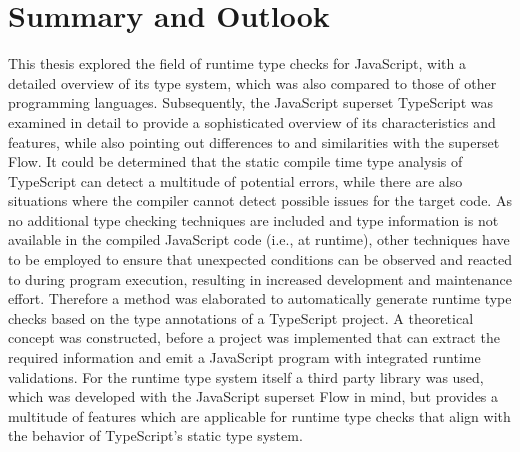 \chapter{Summary and Outlook}
\label{cha:summary_outlook}

This thesis explored the field of runtime type checks for JavaScript, with a detailed overview of its type system, which was also compared to those of other programming languages. Subsequently, the JavaScript superset TypeScript was examined in detail to provide a sophisticated overview of its characteristics and features, while also pointing out differences to and similarities with the superset Flow. It could be determined that the static compile time type analysis of TypeScript can detect a multitude of potential errors, while there are also situations where the compiler cannot detect possible issues for the target code. As no additional type checking techniques are included and type information is not available in the compiled JavaScript code (i.e., at runtime), other techniques have to be employed to ensure that unexpected conditions can be observed and reacted to during program execution, resulting in increased development and maintenance effort. Therefore a method was elaborated to automatically generate runtime type checks based on the type annotations of a TypeScript project. A theoretical concept was constructed, before a project was implemented that can extract the required information and emit a JavaScript program with integrated runtime validations. For the runtime type system itself a third party library was used, which was developed with the JavaScript superset Flow in mind, but provides a multitude of features which are applicable for runtime type checks that align with the behavior of TypeScript's static type system.

